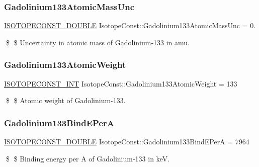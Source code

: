 \subsubsection{\texorpdfstring{Gadolinium133\+Atomic\+Mass\+Unc}{Gadolinium133AtomicMassUnc}}
{\footnotesize\ttfamily \mbox{\hyperlink{group___isotope_const-_macros_ga8f45a7272ce02c0b4c65c44636ed719a}{I\+S\+O\+T\+O\+P\+E\+C\+O\+N\+S\+T\+\_\+\+D\+O\+U\+B\+LE}} Isotope\+Const\+::\+Gadolinium133\+Atomic\+Mass\+Unc = 0.}

\$ \$ Uncertainty in atomic mass of Gadolinium-\/133 in amu. \mbox{\label{group___isotope_const-_gadolinium-_gd133_gadede313afccb9beb0a9c2a9b6261de55}} 
\subsubsection{\texorpdfstring{Gadolinium133\+Atomic\+Weight}{Gadolinium133AtomicWeight}}
{\footnotesize\ttfamily \mbox{\hyperlink{group___isotope_const-_macros_ga5f18360b3e99483a35c32d789e62621c}{I\+S\+O\+T\+O\+P\+E\+C\+O\+N\+S\+T\+\_\+\+I\+NT}} Isotope\+Const\+::\+Gadolinium133\+Atomic\+Weight = 133}

\$ \$ Atomic weight of Gadolinium-\/133. \mbox{\label{group___isotope_const-_gadolinium-_gd133_gae19d0386ceb2228e74f2b4251308f4d5}} 
\subsubsection{\texorpdfstring{Gadolinium133\+Bind\+E\+PerA}{Gadolinium133BindEPerA}}
{\footnotesize\ttfamily \mbox{\hyperlink{group___isotope_const-_macros_ga8f45a7272ce02c0b4c65c44636ed719a}{I\+S\+O\+T\+O\+P\+E\+C\+O\+N\+S\+T\+\_\+\+D\+O\+U\+B\+LE}} Isotope\+Const\+::\+Gadolinium133\+Bind\+E\+PerA = 7964}

\$ \$ Binding energy per A of Gadolinium-\/133 in keV. \mbox{\label{group___isotope_const-_gadolinium-_gd133_ga9b9be69b1d98e66d9d10f66fcd46185d}} 
